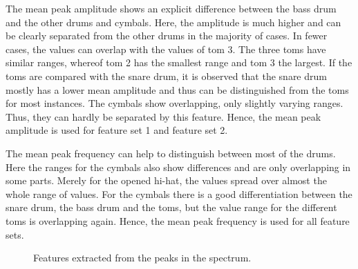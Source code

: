 The mean peak amplitude shows an explicit difference between the bass drum and the other drums and cymbals. Here, the amplitude is much higher and can be clearly separated from the other drums in the majority of cases. In fewer cases, the values can overlap with the values of tom 3. The three toms have similar ranges, whereof tom 2 has the smallest range and tom 3 the largest. If the toms are compared with the snare drum, it is observed that the snare drum mostly has a lower mean amplitude and thus can be distinguished from the toms for most instances. The cymbals show overlapping, only slightly varying ranges. Thus, they can hardly be separated by this feature. Hence, the mean peak amplitude is used for feature set 1 and feature set 2.   

The mean peak frequency can help to distinguish between most of the drums. Here the ranges for the cymbals also show differences and are only overlapping in some parts. Merely for the opened hi-hat, the values spread over almost the whole range of values. For the cymbals there is a good differentiation between the snare drum, the bass drum and the toms, but the value range for the different toms is overlapping again. Hence, the mean peak frequency is used for all feature sets.

\begin{figure}[tp]
	\centering
	\caption{Features extracted from the peaks in the spectrum.}
	\label{fig:visPeakFeatures}
\end{figure}

